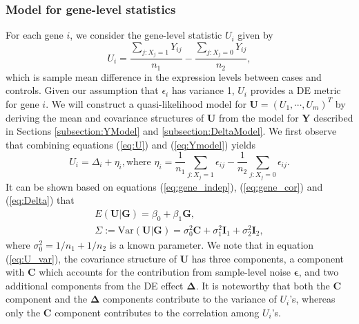 \documentclass[a4,center,fleqn]{NAR}
\begin{document}
	\subsubsection{Model for gene-level statistics}\label{subsection:UModel}
	For each gene $i$, we consider the gene-level statistic $U_i$ given by 
	\begin{equation}
	\label{eq:U}
	U_i = \dfrac{\sum_{j: X_j=1}Y_{ij}}{n_1} - \dfrac{\sum_{j: X_j=0}Y_{ij}}{n_2},
	\end{equation}
	which is sample mean difference in the expression levels between cases and controls. Given our
	assumption that $\epsilon_i$ has variance 1, $U_i$ provides a DE metric for gene $i$. We will
	construct a quasi-likelihood model for $\bm U=(U_1,\cdots,U_m)^T$ by deriving the mean and
	covariance structures of $\bm U$ from the model for $\bm Y$ described in Sections
	\ref{subsection:YModel} and \ref{subsection:DeltaModel}. We first observe that combining 
	equations
	(\ref{eq:U}) and (\ref{eq:Ymodel}) yields
	\begin{equation} 
	U_i = \Delta_i + \eta_i, \text{where } \eta_i = \dfrac{1}{n_1}\sum_{j: X_j=1}\epsilon_{ij}-
	\dfrac{1}{n_2}\sum_{j: X_j=0}\epsilon_{ij}.
	\end{equation}
	It can be shown based on equations (\ref{eq:gene_indep}), (\ref{eq:gene_cor}) and 
	(\ref{eq:Delta})
	that
	\begin{gather}
	E(\bm U|\bm G) = \beta_0+\beta_1 \bm G,\label{eq:U_mean}\\
	\Sigma:=\mbox{Var}(\bm U|\bm G) = \sigma_0^2\bm C + \sigma_1^2\bm I_1+\sigma_2^2\bm
	I_2,\label{eq:U_var}
	\end{gather}
	where $\sigma_0^2=1/n_1+1/n_2$ is a known parameter. We note that in equation (\ref{eq:U_var}), 
	the
	covariance structure of $\bm U$ has three components, a component with $\bm C$ which accounts for
	the contribution from sample-level noise $\bm \epsilon$, and two additional components from the DE
	effect $\bm \Delta$. It is noteworthy that both the $\bm C$ component and the $\bm \Delta$
	components contribute to the variance of $U_i$'s, whereas only the $\bm C$ component contributes to
	the correlation among $U_i$'s.
	
\end{document}
